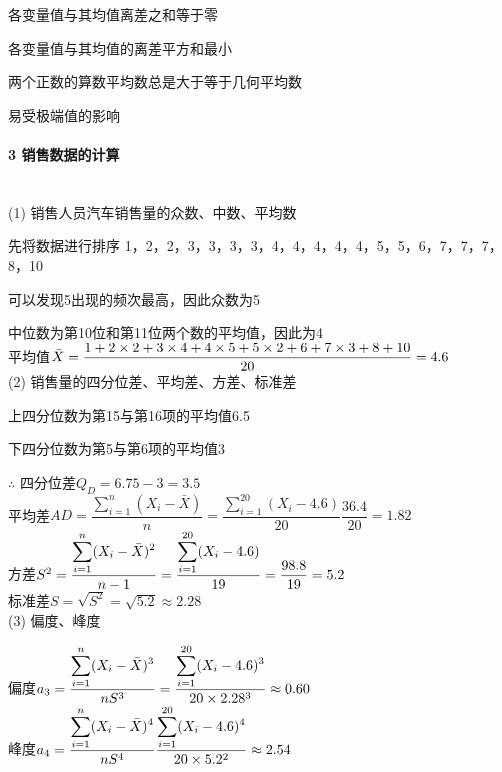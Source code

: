 \documentclass[UTF8]{ctexart}
\begin{document}
各变量值与其均值离差之和等于零

各变量值与其均值的离差平方和最小

两个正数的算数平均数总是大于等于几何平均数

易受极端值的影响

\paragraph{3 销售数据的计算}
~\\
(1) 销售人员汽车销售量的众数、中数、平均数

先将数据进行排序
1，2，2，3，3，3，3，4，4，4，4，4，5，5，6，7，7，7，8，10

可以发现5出现的频次最高，因此众数为5

中位数为第10位和第11位两个数的平均值，因此为4
~\\

平均值$\Bar{X}=\dfrac{1+2\times 2+3\times 4+4\times 5+5\times 2+6+7\times 3+8+10}{20}=4.6$
~\\


\noindent(2) 销售量的四分位差、平均差、方差、标准差

上四分位数为第15与第16项的平均值6.5

下四分位数为第5与第6项的平均值3

$\therefore$
四分位差$Q_D=6.75-3=3.5$
~\\

平均差$AD=\dfrac{\displaystyle \sum_{i=1}^{n}(X_i-\bar{X})}{n}=\dfrac{\displaystyle \sum_{i=1}^{20}(X_i-4.6)}{20}\dfrac{36.4}{20}=1.82$
~\\

方差$S^2=\dfrac{\displaystyle \sum_{i=1}^n (X_i-\Bar{X})^2}{n-1}=\dfrac{\displaystyle\sum_{i=1}^{20} (X_i-4.6)}{19}=\dfrac{98.8}{19}=5.2$
~\\

标准差$S=\sqrt{S^2}=\sqrt{5.2}\approx2.28$
~\\

\noindent(3) 偏度、峰度

偏度$a_3= \dfrac{\displaystyle\sum_{i=1}^{n} (X_i-\Bar{X})^3}{nS^3}=\dfrac{\displaystyle \sum_{i=1}^{20} (X_i-4.6)^3}{20\times 2.28^3}\approx0.60$
~\\

峰度$a_4= \dfrac{\displaystyle \sum_{i=1}^{n} (X_i-\Bar{X})^4}{nS^4}\dfrac{\displaystyle \sum_{i=1}^{20} (X_i-4.6)^4}{20\times 5.2^2}\approx2.54$
\\
\end{document}
